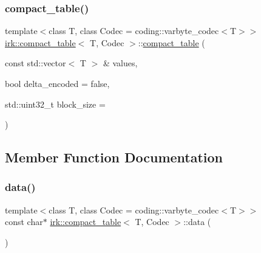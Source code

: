 \mbox{\label{classirk_1_1compact__table_a3400a8843f4c286fd49417eeca2c9e74}} 
\subsubsection{\texorpdfstring{compact\+\_\+table()}{compact\_table()}\hspace{0.1cm}{\footnotesize\ttfamily [2/2]}}
{\footnotesize\ttfamily template$<$class T, class Codec = coding\+::varbyte\+\_\+codec$<$\+T$>$$>$ \\
\mbox{\hyperlink{classirk_1_1compact__table}{irk\+::compact\+\_\+table}}$<$ T, Codec $>$\+::\mbox{\hyperlink{classirk_1_1compact__table}{compact\+\_\+table}} (\begin{DoxyParamCaption}\item[{const std\+::vector$<$ T $>$ \&}]{values,  }\item[{bool}]{delta\+\_\+encoded = {\ttfamily false},  }\item[{std\+::uint32\+\_\+t}]{block\+\_\+size = {} }\end{DoxyParamCaption})\hspace{0.3cm}{\ttfamily [inline]}}



\subsection{Member Function Documentation}
\mbox{\label{classirk_1_1compact__table_a33d2d55685fe583f89521c2ca9797973}} 
\subsubsection{\texorpdfstring{data()}{data()}}
{\footnotesize\ttfamily template$<$class T, class Codec = coding\+::varbyte\+\_\+codec$<$\+T$>$$>$ \\
const char$\ast$ \mbox{\hyperlink{classirk_1_1compact__table}{irk\+::compact\+\_\+table}}$<$ T, Codec $>$\+::data (\begin{DoxyParamCaption}{ }\end{DoxyParamCaption})\hspace{0.3cm}{\ttfamily [inline]}}

